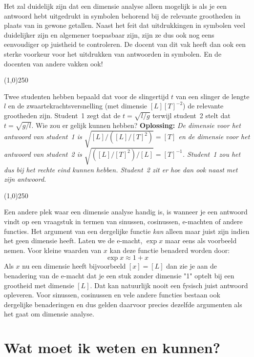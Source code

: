 Het zal duidelijk zijn dat een dimensie analyse alleen mogelijk is als je een antwoord hebt
uitgedrukt in symbolen behorend bij de relevante grootheden in plaats van in gewone getallen. 
Naast het feit dat uitdrukkingen in symbolen veel duidelijker zijn en algemener toepasbaar
zijn, zijn ze dus ook nog eens eenvoudiger op juistheid te controleren. De docent van dit vak
heeft dan ook een sterke voorkeur voor het uitdrukken van antwoorden in symbolen. En de
docenten van andere vakken ook!

\begin{center}
\line(1,0){250}
\end{center}
\begin{voorbeeld} 
\label{ex:dimensie}
Twee studenten hebben bepaald dat voor de slingertijd $t$ van een slinger
de lengte $l$ en de zwaartekrachtsversnelling (met dimensie $[L][T]^{-2}$) de 
relevante grootheden zijn. Student~1 zegt dat de $t=\sqrt{l/g}$ terwijl student~2
stelt dat $t=\sqrt{g/l}$. Wie zou er gelijk kunnen hebben?
{\bf Oplossing: }{\it De dimensie voor het antwoord van student~1 is $\sqrt{[L]/([L]/[T]^2)}=[T]$
en de dimensie voor het antwoord van student~2 is $\sqrt{([L]/[T]^2)/[L]}=[T]^{-1}$. Student~1
zou het dus bij het rechte eind kunnen hebben. Student~2 zit er hoe dan ook naast met
zijn antwoord.
 }
\end{voorbeeld}
\begin{center}
\line(1,0){250}
\end{center}

Een andere plek waar een dimensie analyse handig is, is wanneer je een antwoord 
vindt op een vraagstuk in termen van sinussen, cosinussen, e-machten of andere functies.
Het argument van een dergelijke functie {\it kan} alleen maar juist zijn indien het geen dimensie
heeft.  Laten we de e-macht, $\exp x$  maar eens als voorbeeld nemen. Voor kleine
waarden van $x$ kan deze functie benaderd worden door:
\begin{equation}
\exp x \approx 1 + x 
\end{equation}
Als $x$ nu een dimensie heeft bijvoorbeeld $[x] = [L]$ dan zie je aan de benadering van
de e-macht  dat je een stuk zonder dimensie "1" optelt bij een grootheid met dimensie $[L]$. Dat
kan natuurlijk nooit een fysisch juist antwoord opleveren.  Voor sinussen, cosinussen en 
vele andere functies bestaan ook dergelijke benaderingen en dus gelden daarvoor precies
dezelfde argumenten als het gaat om dimensie analyse.

\section{Wat moet ik weten en kunnen?}

